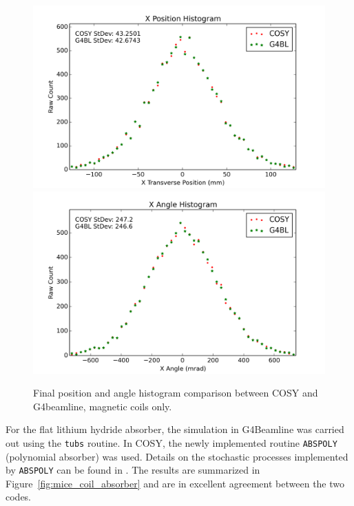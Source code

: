 \documentclass{jacow}
\begin{document}
\begin{figure}[!ht]
\centering
\includegraphics[width=\columnwidth]{xposition.png}
\includegraphics[width=\columnwidth]{xangle.png}
\caption{Final position and angle histogram comparison between COSY and G4beamline, magnetic coils only.}
\label{fig:mice_coil_histograms}
\end{figure}

For the flat lithium hydride absorber, the simulation in G4Beamline was carried out using the \texttt{tubs} routine. In COSY, the newly implemented routine \texttt{ABSPOLY} (polynomial absorber) was used. Details on the stochastic processes implemented by \texttt{ABSPOLY} can be found in \cite{ipac2015}. The results are summarized in Figure~\ref{fig:mice_coil_absorber} and are in excellent agreement between the two codes.
\end{document}
